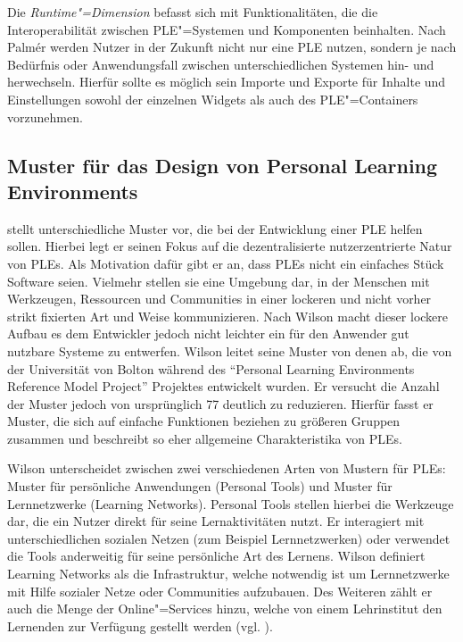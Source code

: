 Die \emph{Runtime"=Dimension} befasst sich mit Funktionalitäten, die die Interoperabilität zwischen PLE"=Systemen und Komponenten beinhalten. Nach Palmér werden Nutzer in der Zukunft nicht nur eine PLE nutzen, sondern je nach Bedürfnis oder Anwendungsfall zwischen unterschiedlichen Systemen hin- und herwechseln. Hierfür sollte es möglich sein Importe und Exporte für Inhalte und Einstellungen sowohl der einzelnen Widgets als auch des PLE"=Containers vorzunehmen.

\subsection{Muster für das Design von Personal Learning Environments}\label{section:wilson_patterns}
\cite{Wilson2008} stellt unterschiedliche Muster vor, die bei der Entwicklung einer PLE helfen sollen. Hierbei legt er seinen Fokus auf die dezentralisierte  nutzerzentrierte Natur von PLEs. Als Motivation dafür gibt er an, dass PLEs nicht ein einfaches Stück Software seien. Vielmehr stellen sie eine Umgebung dar, in der Menschen mit Werkzeugen, Ressourcen und Communities in einer lockeren und nicht vorher strikt fixierten Art und Weise kommunizieren. Nach Wilson macht dieser lockere Aufbau es dem Entwickler jedoch nicht leichter ein für den Anwender gut nutzbare Systeme zu entwerfen. Wilson leitet seine Muster von denen ab, die von der Universität von Bolton während des "`Personal Learning Environments Reference Model Project"' Projektes entwickelt wurden. Er versucht die Anzahl der Muster jedoch von ursprünglich 77 deutlich zu reduzieren. Hierfür fasst er Muster, die sich auf einfache Funktionen beziehen zu größeren Gruppen zusammen und beschreibt so eher allgemeine Charakteristika von PLEs.

Wilson unterscheidet zwischen zwei verschiedenen Arten von Mustern für PLEs: Muster für persönliche Anwendungen (Personal Tools) und Muster für Lernnetzwerke (Learning Networks). Personal Tools stellen hierbei die Werkzeuge dar, die ein Nutzer direkt für seine Lernaktivitäten nutzt. Er interagiert mit unterschiedlichen sozialen Netzen (zum Beispiel Lernnetzwerken) oder verwendet die Tools anderweitig für seine persönliche Art des Lernens. 
Wilson definiert Learning Networks als die Infrastruktur, welche notwendig ist um Lernnetzwerke mit Hilfe sozialer Netze oder Communities aufzubauen. Des Weiteren zählt er auch die Menge der Online"=Services hinzu, welche von einem Lehrinstitut den Lernenden zur Verfügung gestellt werden (vgl. \cite{Wilson2008}).

